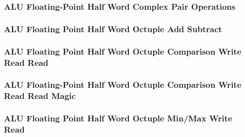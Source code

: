 

\subsubsection[{\small ALU Floating-Point Half Word Complex Pair Operations}]{ALU Floating-Point Half Word Complex Pair Operations} \label{sec:format-ALU-FHCPOP}



\subsubsection[{\small ALU Floating Point Half Word Octuple Add Subtract}]{ALU Floating Point Half Word Octuple Add Subtract} \label{sec:format-ALU-FHOADD}



\subsubsection[{\small ALU Floating Point Half Word Octuple Comparison Write Read Read}]{ALU Floating Point Half Word Octuple Comparison Write Read Read} \label{sec:format-ALU-FHOCWRR}



\subsubsection[{\small ALU Floating-Point Half Word Octuple Comparison Write Read Read Magic}]{ALU Floating-Point Half Word Octuple Comparison Write Read Read Magic} \label{sec:format-ALU-FHOCWRR.M}



\subsubsection[{\small ALU Floating Point Half Word Octuple Min/Max Write Read}]{ALU Floating Point Half Word Octuple Min/Max Write Read} \label{sec:format-ALU-FHOMMWR}

